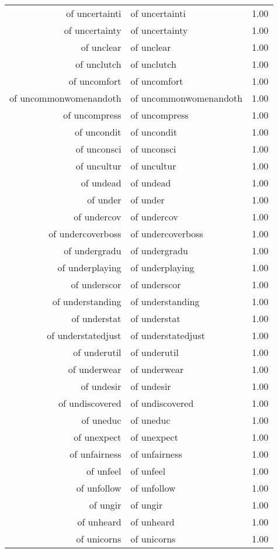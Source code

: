 \begin{table}[ht]
\begin{tabular}{rlr}
  of uncertainti & of uncertainti & 1.00 \\ 
  of uncertainty & of uncertainty & 1.00 \\ 
  of unclear & of unclear & 1.00 \\ 
  of unclutch & of unclutch & 1.00 \\ 
  of uncomfort & of uncomfort & 1.00 \\ 
  of uncommonwomenandoth & of uncommonwomenandoth & 1.00 \\ 
  of uncompress & of uncompress & 1.00 \\ 
  of uncondit & of uncondit & 1.00 \\ 
  of unconsci & of unconsci & 1.00 \\ 
  of uncultur & of uncultur & 1.00 \\ 
  of undead & of undead & 1.00 \\ 
  of under & of under & 1.00 \\ 
  of undercov & of undercov & 1.00 \\ 
  of undercoverboss & of undercoverboss & 1.00 \\ 
  of undergradu & of undergradu & 1.00 \\ 
  of underplaying & of underplaying & 1.00 \\ 
  of underscor & of underscor & 1.00 \\ 
  of understanding & of understanding & 1.00 \\ 
  of understat & of understat & 1.00 \\ 
  of understatedjust & of understatedjust & 1.00 \\ 
  of underutil & of underutil & 1.00 \\ 
  of underwear & of underwear & 1.00 \\ 
  of undesir & of undesir & 1.00 \\ 
  of undiscovered & of undiscovered & 1.00 \\ 
  of uneduc & of uneduc & 1.00 \\ 
  of unexpect & of unexpect & 1.00 \\ 
  of unfairness & of unfairness & 1.00 \\ 
  of unfeel & of unfeel & 1.00 \\ 
  of unfollow & of unfollow & 1.00 \\ 
  of ungir & of ungir & 1.00 \\ 
  of unheard & of unheard & 1.00 \\ 
  of unicorns & of unicorns & 1.00 \\ 

\end{tabular}
\end{table}
